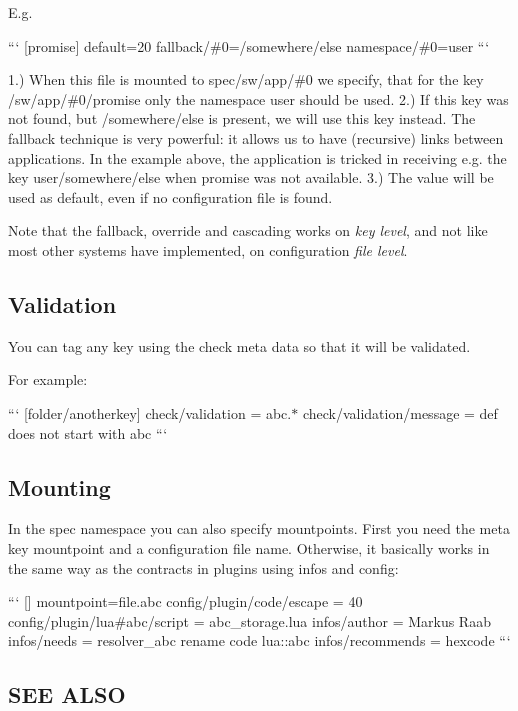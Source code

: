 E.\+g.

``` \mbox{[}promise\mbox{]} default=20 fallback/\#0=/somewhere/else namespace/\#0=user ```

1.) When this file is mounted to {\ttfamily spec/sw/app/\#0} we specify, that for the key {\ttfamily /sw/app/\#0/promise} only the namespace {\ttfamily user} should be used. 2.) If this key was not found, but {\ttfamily /somewhere/else} is present, we will use this key instead. The {\ttfamily fallback} technique is very powerful\+: it allows us to have (recursive) links between applications. In the example above, the application is tricked in receiving e.\+g. the key {\ttfamily user/somewhere/else} when {\ttfamily promise} was not available. 3.) The value {} will be used as default, even if no configuration file is found.

Note that the fallback, override and cascading works on {\itshape key level}, and not like most other systems have implemented, on configuration {\itshape file level}.

\subsection*{Validation}

You can tag any key using the {\ttfamily check} meta data so that it will be validated.

For example\+:

``` \mbox{[}folder/anotherkey\mbox{]} check/validation = abc.$\ast$ check/validation/message = def does not start with abc ```

\subsection*{Mounting}

In the spec namespace you can also specify mountpoints. First you need the meta key {\ttfamily mountpoint} and a configuration file name. Otherwise, it basically works in the same way as the contracts in plugins using {\ttfamily infos} and {\ttfamily config}\+:

``` \mbox{[}\mbox{]} mountpoint=file.\+abc config/plugin/code/escape = 40 config/plugin/lua\#abc/script = abc\+\_\+storage.\+lua infos/author = Markus Raab infos/needs = resolver\+\_\+abc rename code lua\+::abc infos/recommends = hexcode ```

\subsection*{S\+E\+E A\+L\+S\+O}


